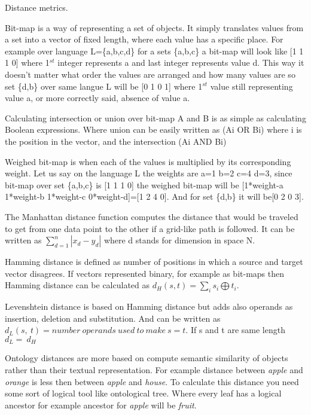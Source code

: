 \documentclass{article}
\begin{document}

\noindent Distance metrics.

\noindent Bit-map is a way of representing a set of objects. It simply translates values from a set into a vector of fixed length, where each value has a specific place. For example over language L=\{a,b,c,d\} for a sets \{a,b,c\} a bit-map will look like [1 1 1 0] where 1${}^{st}$ integer represents a and last integer represents value d. This way it doesn't matter what order the values are arranged and how many values are so set \{d,b\} over same langue L will be [0 1 0 1] where 1${}^{st}$ value still representing value a, or more correctly said, absence of value a.

\noindent Calculating intersection or union over bit-map A and B is as simple as calculating Boolean expressions. Where union can be easily written as (Ai OR Bi) where i is the position in the vector, and the intersection (Ai AND Bi)

\noindent Weighed bit-map is when each of the values is multiplied by its corresponding weight. Let us say on the language L the weights are a=1 b=2 c=4 d=3, since bit-map over set \{a,b,c\} is [1 1 1 0] the weighed bit-map will be [1*weight-a 1*weight-b 1*weight-c 0*weight-d]=[1 2 4 0]. And for set \{d,b\} it will be[0 2 0 3].

\noindent The Manhattan distance function computes the distance that would be traveled to get from one data point to the other if a grid-like path is followed. It can be written as $\sum^n_{d=1}{|x_d-y_d|}$ where d stands for dimension in space N.

\noindent Hamming distance is defined as number of positions in which a source and target vector disagrees. If vectors represented binary, for example as bit-maps then Hamming distance can be calculated as $d_H\left(s,t\right)=\sum_i{s_i\bigoplus t_i}$.

\noindent Levenshtein distance is based on Hamming distance but adds also operands as insertion, deletion and substitution. And can be written as $d_L\left(s,\ t\right)=number\ operands\ used\ to\ make\ s=t$. If s and t are same length $d_L=\ d_H$

\noindent Ontology distances are more based on compute semantic similarity of objects rather than their textual representation. For example distance between \textit{apple} and \textit{orange} is less then between \textit{apple} and \textit{house}. To calculate this distance you need some sort of logical tool like ontological tree. Where every leaf has a logical ancestor for example ancestor for \textit{apple }will be \textit{fruit}.
\end{document}
